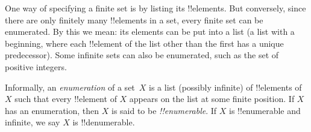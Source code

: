 \documentclass[../../../include/open-logic-section]{subfiles}
\begin{document}


One way of specifying a finite set is by listing its !!{element}s. But
conversely, since there are only finitely many !!{element}s in a set,
every finite set can be enumerated.  By this we mean: its elements can
be put into a list (a list with a beginning, where each !!{element} of
the list other than the first has a unique predecessor).  Some
infinite sets can also be enumerated, such as the set of positive
integers.

\begin{defn}[Enumeration]
Informally, an \emph{enumeration} of a set~$X$ is a list (possibly
infinite) of !!{element}s of~$X$ such that every !!{element} of $X$
appears on the list at some finite position. If $X$ has an
enumeration, then $X$ is said to be \emph{!!{enumerable}}.  If $X$ is
!!{enumerable} and infinite, we say $X$ is !!{denumerable}.
\end{defn}
\end{document}
